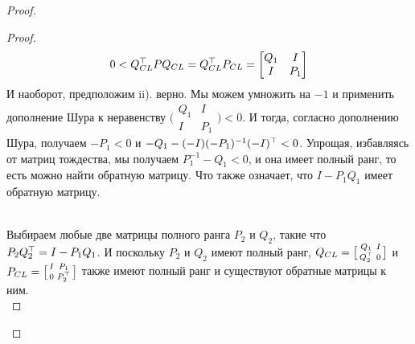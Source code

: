 \begin{proof}
\begin{proof}
\begin{align}
			0<{Q}_{CL}^\top {P} {Q}_{CL} = {Q}_{CL}^\top {P}_{CL} = 
			\begin{bmatrix} 
				{Q}_{1} & I \\ 
				I & {P}_{1}
			\end{bmatrix}
		\end{align}
		И наоборот, предположим ii). верно. Мы можем умножить на $-1$ и применить дополнение Шура к неравенству 
		$\bigl( \begin{smallmatrix} 
			{Q}_{1} & I \\ 
			I & {P}_{1}\end{smallmatrix} \bigr) <0$. 
		И тогда, согласно дополнению Шура, получаем $-{P}_{1}<0$ и $-{Q}_{1}-(-{I})(-{P}_{1})^{-1}(-{I})^\top<0$. Упрощая, избавляясь от матриц тождества, мы получаем ${P}_{1}^{-1}-{Q}_{1}<0$, и она имеет полный ранг, то есть можно найти обратную матрицу. Что также означает, что ${I}-{P}_{1}{Q}_{1}$ имеет обратную матрицу.\\\
		
		Выбираем любые две матрицы полного ранга ${P}_{2}$ и ${Q}_{2}$, такие что ${P}_{2}{Q}_{2}^\top={I}-{P}_{1}{Q}_{1}$. И поскольку ${P}_2$ и ${Q}_2$ имеют полный ранг, ${Q}_{CL}=\bigl[\begin{smallmatrix}  
			{Q}_{1} & {I}\\
			{Q}_{2}^\top & 0
		\end{smallmatrix} \bigr]$ и 
		${P}_{CL}=\bigl[ \begin{smallmatrix}
			{I} & {P}_{1} \\
			0 & {P}_{2}^\top
		\end{smallmatrix} \bigr]$ также имеют полный ранг и существуют обратные матрицы к ним.\\
		

\end{proof}
\end{proof}
